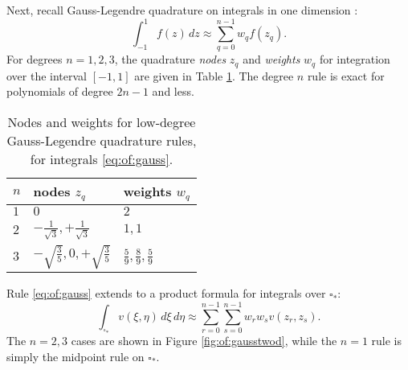 Next, recall Gauss-Legendre quadrature on integrals in one dimension \citep{GreenbaumChartier2012}:
\begin{equation}
\int_{-1}^1 f(z)\,dz \approx \sum_{q=0}^{n-1} w_q f(z_q).  \label{eq:of:gauss}
\end{equation}
For degrees $n=1,2,3$, the quadrature \emph{nodes} $z_q$ and \emph{weights} $w_q$ for integration over the interval $[-1,1]$ are given in Table \ref{tab:of:gauss}.  The degree $n$ rule is exact for polynomials of degree $2n-1$ and less.

\begin{table}[h]
\vspace{0.1in}

\begin{tabular}{lll}
$n$\phantom{foobar} & nodes $z_q$\phantom{foo} & weights $w_q$ \\ \hline
$1$ & $0$ & $2$ \\
$2$ & $-\frac{1}{\sqrt{3}}, +\frac{1}{\sqrt{3}}$ & $1,1$ \\
$3$ & $-\sqrt{\frac{3}{5}}, 0, +\sqrt{\frac{3}{5}}$ & $\frac{5}{9}, \frac{8}{9}, \frac{5}{9}$ \\
\end{tabular}

\vspace{0.1in}
\caption{Nodes and weights for low-degree Gauss-Legendre quadrature rules, for integrals \eqref{eq:of:gauss}.} \label{tab:of:gauss}
\end{table}

Rule \eqref{eq:of:gauss} extends to a product formula for integrals over $\square_\ast$:
\begin{equation}
\int_{\square_\ast} v(\xi,\eta) \,d\xi\,d\eta \approx \sum_{r=0}^{n-1} \sum_{s=0}^{n-1} w_r w_s v(z_r,z_s).  \label{eq:of:tensorgauss}
\end{equation}
The $n=2,3$ cases are shown in Figure \ref{fig:of:gausstwod}, while the $n=1$ rule is simply the midpoint rule on $\square_\ast$.

